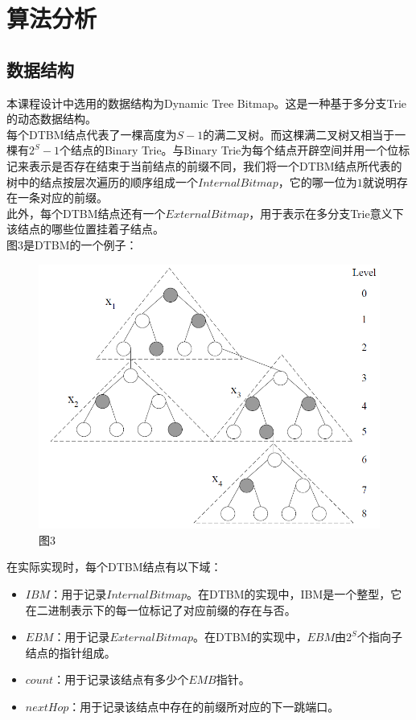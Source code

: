 
\section{算法分析}

\subsection{数据结构}

本课程设计中选用的数据结构为Dynamic Tree Bitmap。这是一种基于多分支Trie的动态数据结构。\\
\indent
每个DTBM结点代表了一棵高度为$S - 1$的满二叉树。而这棵满二叉树又相当于一棵有$2^{S}-1$个结点的Binary Trie。与Binary Trie为每个结点开辟空间并用一个位标记来表示是否存在结束于当前结点的前缀不同，我们将一个DTBM结点所代表的树中的结点按层次遍历的顺序组成一个$Internal Bitmap$，它的哪一位为$1$就说明存在一条对应的前缀。\\
\indent
此外，每个DTBM结点还有一个$External Bitmap$，用于表示在多分支Trie意义下该结点的哪些位置挂着子结点。\\
\indent
图3是DTBM的一个例子：\\

\begin{figure}[h!]
\centering
\includegraphics[scale=0.6]{dtbm_eg.png}
\caption{图3}
\end{figure}

\indent
在实际实现时，每个DTBM结点有以下域：
\begin{itemize}
\item $IBM$：用于记录$Internal Bitmap$。在DTBM的实现中，IBM是一个整型，它在二进制表示下的每一位标记了对应前缀的存在与否。
\item $EBM$：用于记录$External Bitmap$。在DTBM的实现中，$EBM$由$2^{S}$个指向子结点的指针组成。
\item $count$：用于记录该结点有多少个$EMB$指针。
\item $nextHop$：用于记录该结点中存在的前缀所对应的下一跳端口。
\end{itemize}

